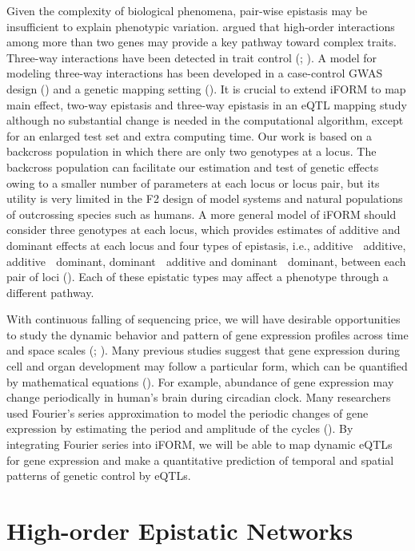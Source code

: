\documentclass[11pt,]{book}
\theoremstyle{definition}
\theoremstyle{definition}
\theoremstyle{remark}
\begin{document}
Given the complexity of biological phenomena, pair-wise epistasis may be
insufficient to explain phenotypic variation.
\cite{imielinski2008exploiting} argued that high-order interactions
among more than two genes may provide a key pathway toward complex
traits. Three-way interactions have been detected in trait control
(\cite{mcmullen1998quantitative}; \cite{stich2007power}). A model for
modeling three-way interactions has been developed in a case-control
GWAS design (\cite{wang2010general}) and a genetic mapping setting
(\cite{pang2013statistical}). It is crucial to extend iFORM to map main
effect, two-way epistasis and three-way epistasis in an eQTL mapping
study although no substantial change is needed in the computational
algorithm, except for an enlarged test set and extra computing time. Our
work is based on a backcross population in which there are only two
genotypes at a locus. The backcross population can facilitate our
estimation and test of genetic effects owing to a smaller number of
parameters at each locus or locus pair, but its utility is very limited
in the F2 design of model systems and natural populations of outcrossing
species such as humans. A more general model of iFORM should consider
three genotypes at each locus, which provides estimates of additive and
dominant effects at each locus and four types of epistasis, i.e.,
additive  additive, additive  dominant, dominant  additive and
dominant  dominant, between each pair of loci
(\cite{kempthorne1968correlation}). Each of these epistatic types may
affect a phenotype through a different pathway.

With continuous falling of sequencing price, we will have desirable
opportunities to study the dynamic behavior and pattern of gene
expression profiles across time and space scales
(\cite{vinuela2010genome}; \cite{ackermann2013impact}). Many previous
studies suggest that gene expression during cell and organ development
may follow a particular form, which can be quantified by mathematical
equations (\cite{kim2010wavelet}). For example, abundance of gene
expression may change periodically in human's brain during circadian
clock. Many researchers used Fourier's series approximation to model the
periodic changes of gene expression by estimating the period and
amplitude of the cycles (\cite{li2013using}). By integrating Fourier
series into iFORM, we will be able to map dynamic eQTLs for gene
expression and make a quantitative prediction of temporal and spatial
patterns of genetic control by eQTLs.

\hypertarget{highorder}{\chapter{High-order Epistatic
Networks}\label{highorder}}
\end{document}

